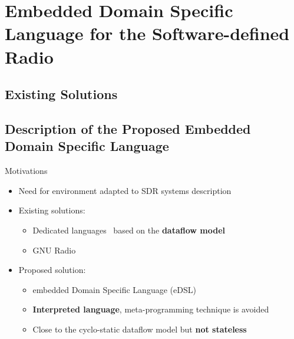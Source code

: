
\section[eDSL for the SDR]{Embedded Domain Specific Language for the Software-defined Radio}

\subsection[Existing Solutions]{Existing Solutions}

\subsection[Proposed eDSL]{Description of the Proposed Embedded Domain Specific Language}

\begin{frame}{Motivations}
  \begin{itemize}
    \item Need for environment adapted to SDR systems description
    \vspace{0.1cm}
    \item<2-> Existing solutions:
    \begin{itemize}
      \item Dedicated languages~\cite{Amarasinghe2005,DeOliveiraCastro2017} based on the \textbf{dataflow model}
      \item GNU Radio~\cite{GNURadio}
    \end{itemize}
    \vspace{0.1cm}
    \item<3-> Proposed solution:
    \begin{itemize}
      \item \Cxx embedded Domain Specific Language (eDSL)
      \item \textbf{Interpreted language}, meta-programming technique is avoided
      \item Close to the cyclo-static dataflow model but \textbf{not stateless}
    \end{itemize}
  \end{itemize}
  \vspace{0.5cm}
\end{frame}

